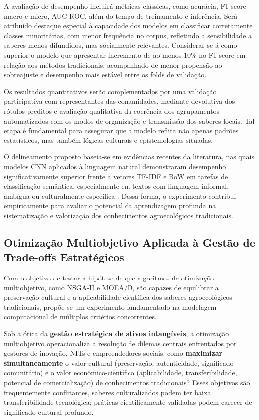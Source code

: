A avaliação de desempenho incluirá métricas clássicas, como acurácia, F1-score macro e micro, AUC-ROC, além do tempo de treinamento e inferência. Será atribuído destaque especial à capacidade dos modelos em classificar corretamente classes minoritárias, com menor frequência no corpus, refletindo a sensibilidade a saberes menos difundidos, mas socialmente relevantes. Considerar-se-á como superior o modelo que apresentar incremento de ao menos 10\% no F1-score em relação aos métodos tradicionais, acompanhado de menor propensão ao sobreajuste e desempenho mais estável entre os folds de validação.

Os resultados quantitativos serão complementados por uma validação participativa com representantes das comunidades, mediante devolutiva dos rótulos preditos e avaliação qualitativa da coerência dos agrupamentos automatizados com os modos de organização e transmissão dos saberes locais. Tal etapa é fundamental para assegurar que o modelo reflita não apenas padrões estatísticos, mas também lógicas culturais e epistemologias situadas.

O delineamento proposto baseia-se em evidências recentes da literatura, nas quais modelos CNN aplicados à linguagem natural demonstraram desempenho significativamente superior frente a vetores TF-IDF e BoW em tarefas de classificação semântica, especialmente em textos com linguagem informal, ambígua ou culturalmente específica \cite{Kamyab2021,Souza2023,Yeasmin2022}. Dessa forma, o experimento contribui empiricamente para avaliar o potencial da aprendizagem profunda na sistematização e valorização dos conhecimentos agroecológicos tradicionais.


\subsection{Otimização Multiobjetivo Aplicada à Gestão de Trade-offs Estratégicos}

Com o objetivo de testar a hipótese de que algoritmos de otimização multiobjetivo, como NSGA-II e MOEA/D, são capazes de equilibrar a preservação cultural e a aplicabilidade científica dos saberes agroecológicos tradicionais, propõe-se um experimento fundamentado na modelagem computacional de múltiplos critérios concorrentes.

Sob a ótica da \textbf{gestão estratégica de ativos intangíveis}, a otimização multiobjetivo operacionaliza a resolução de dilemas centrais enfrentados por gestores de inovação, NITs e empreendedores sociais: como \textbf{maximizar simultaneamente} o valor cultural (preservação, autenticidade, significado comunitário) e o valor econômico-científico (aplicabilidade, transferibilidade, potencial de comercialização) de conhecimentos tradicionais? Esses objetivos são frequentemente conflitantes, saberes culturalizados podem ter baixa transferibilidade tecnológica; práticas cientificamente validadas podem carecer de significado cultural profundo.

